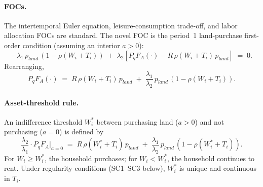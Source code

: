 \documentclass[11pt, a4paper]{article}
\begin{document}
\paragraph{FOCs.} The intertemporal Euler equation, leisure-consumption
trade-off, and labor allocation FOCs are standard. The novel FOC is the
period~1 land-purchase first-order condition (assuming an interior $a > 0$):
\begin{equation}
- \lambda_1\, p_{land}\, (1 - \rho(W_i + T_i)) \;+\; \lambda_2 \left[P_q F_A(\cdot) - R\, \rho(W_i + T_i)\, p_{land}\right] \;=\; 0.
\label{eq:appB-foc-a}
\end{equation}
Rearranging,
\begin{equation}
P_q F_A(\cdot) \;=\; R\, \rho(W_i + T_i)\, p_{land} \;+\; \frac{\lambda_1}{\lambda_2}\, p_{land}\, (1 - \rho(W_i + T_i)).
\label{eq:appB-mpA}
\end{equation}

\paragraph{Asset-threshold rule.} An indifference threshold $W_i^*$ between
purchasing land ($a > 0$) and not purchasing ($a = 0$) is defined by
\begin{equation}
\frac{\lambda_2}{\lambda_1} \cdot P_q F_A \big|_{a=0} \;=\; R\, \rho(W_i^* + T_i)\, p_{land} \;+\; \frac{\lambda_1}{\lambda_2}\, p_{land}\, (1 - \rho(W_i^* + T_i)).
\label{eq:appB-threshold}
\end{equation}
For $W_i \ge W_i^*$, the household purchases; for $W_i < W_i^*$, the household
continues to rent. Under regularity conditions (SC1--SC3 below), $W_i^*$ is
unique and continuous in $T_i$.
\end{document}
